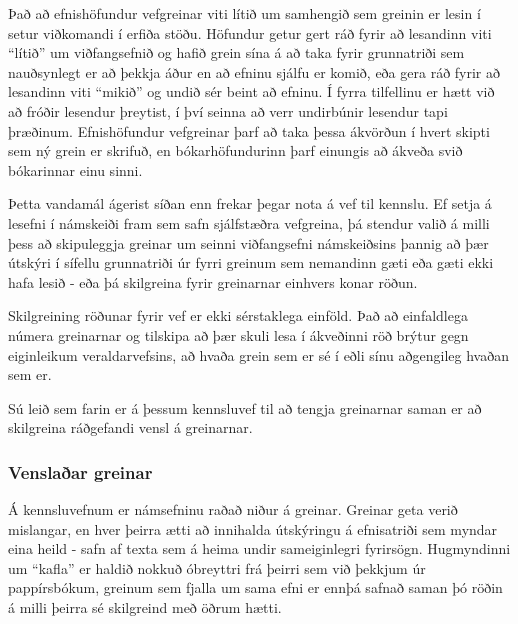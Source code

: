 \documentclass[a4paper,12pt,twoside,BCOR=10mm]{scrbook}
\begin{document}
Það að efnishöfundur vefgreinar viti lítið um samhengið sem greinin er lesin í setur viðkomandi í erfiða stöðu. Höfundur getur gert ráð fyrir að lesandinn viti ``lítið'' um viðfangsefnið og hafið grein sína á að taka fyrir grunnatriði sem nauðsynlegt er að þekkja áður en að efninu sjálfu er komið, eða gera ráð fyrir að lesandinn viti ``mikið'' og undið sér beint að efninu. Í fyrra tilfellinu er hætt við að fróðir lesendur þreytist, í því seinna að verr undirbúnir lesendur tapi þræðinum. Efnishöfundur vefgreinar þarf að taka þessa ákvörðun í hvert skipti sem ný grein er skrifuð, en bókarhöfundurinn þarf einungis að ákveða svið bókarinnar einu sinni.

Þetta vandamál ágerist síðan enn frekar þegar nota á vef til kennslu. Ef setja á lesefni í námskeiði fram sem safn sjálfstæðra vefgreina, þá stendur valið á milli þess að skipuleggja greinar um seinni viðfangsefni námskeiðsins þannig að þær útskýri í sífellu grunnatriði úr fyrri greinum sem nemandinn gæti eða gæti ekki hafa lesið - eða þá skilgreina fyrir greinarnar einhvers konar röðun.

Skilgreining röðunar fyrir vef er ekki sérstaklega einföld. Það að einfaldlega númera greinarnar og tilskipa að þær skuli lesa í ákveðinni röð brýtur gegn eiginleikum veraldarvefsins, að hvaða grein sem er sé í eðli sínu aðgengileg hvaðan sem er. 

Sú leið sem farin er á þessum kennsluvef til að tengja greinarnar saman er að skilgreina ráðgefandi vensl á greinarnar.
\subsubsection{Venslaðar greinar}
Á kennsluvefnum er námsefninu raðað niður á greinar. Greinar geta verið mislangar, en hver þeirra ætti að innihalda útskýringu á efnisatriði sem myndar eina heild - safn af texta sem á heima undir sameiginlegri fyrirsögn. Hugmyndinni um ``kafla'' er haldið nokkuð óbreyttri frá þeirri sem við þekkjum úr pappírsbókum, greinum sem fjalla um sama efni er ennþá safnað saman þó röðin á milli þeirra sé skilgreind með öðrum hætti.
\end{document}
